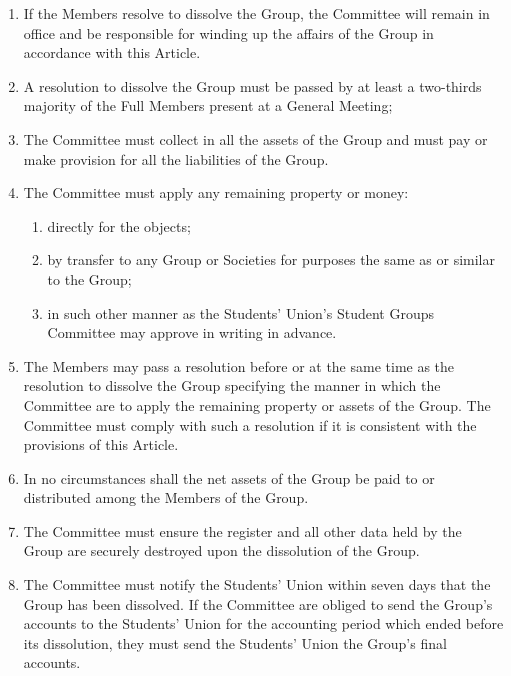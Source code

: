 \documentclass[12pt]{constitution}
\begin{document}
\begin{enumerate}
    \item If the Members resolve to dissolve the Group, the Committee will remain in office and be responsible for winding up the affairs of the Group in accordance with this Article.
    \item A resolution to dissolve the Group must be passed by at least a two-thirds majority of the Full Members present at a General Meeting;
    \item The Committee must collect in all the assets of the Group and must pay or make provision for all the liabilities of the Group.
    \item The Committee must apply any remaining property or money:
    \begin{enumerate}
        \item directly for the objects;
        \item by transfer to any Group or Societies for purposes the same as or similar to the Group;
        \item in such other manner as the Students' Union's Student Groups Committee may approve in writing in advance.
    \end{enumerate}

\item The Members may pass a resolution before or at the same time as the resolution to dissolve the Group specifying the manner in which the Committee are to apply the remaining property or assets of the Group.  The Committee must comply with such a resolution if it is consistent with the provisions of this Article.
    \item In no circumstances shall the net assets of the Group be paid to or distributed among the Members of the Group.
    \item The Committee must ensure the register and all other data held by the Group are securely destroyed upon the dissolution of the Group.
    \item The Committee must notify the Students' Union within seven days that the Group has been dissolved.  If the Committee are obliged to send the Group's accounts to the Students' Union for the accounting period which ended before its dissolution, they must send the Students' Union the Group's final accounts.
\end{enumerate}
 

\end{document}
